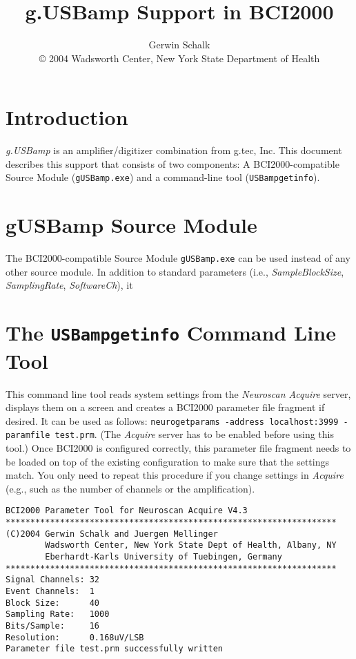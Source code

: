 \documentclass[letterpaper, oneside, 12pt]{article}
\newcommand{\ie}{i.e.,}
\newcommand{\eg}{e.g.,}
\begin{document}
%
\title{g.USBamp Support in BCI2000}
\author{Gerwin Schalk\\ \small{\copyright{} 2004 Wadsworth Center, New York State Department of Health}}
\maketitle

\tableofcontents

\newpage


\section{Introduction}

\sloppypar \emph{g.USBamp} is an amplifier/digitizer combination from g.tec, 
Inc. This document describes this support that consists of two components: A 
BCI2000-compatible Source Module (\texttt{gUSBamp.exe}) and a command-line 
tool (\texttt{USBampgetinfo}). 

\section{gUSBamp Source Module}

The BCI2000-compatible Source Module \texttt{gUSBamp.exe} can be used instead 
of any other source module. In addition to standard parameters (\ie{} 
\emph{SampleBlockSize}, \emph{SamplingRate}, \emph{SoftwareCh}), it 


\section{The \texttt{USBampgetinfo} Command Line Tool}

This command line tool reads system settings from the \emph{Neuroscan Acquire} 
server, displays them on a screen and creates a BCI2000 parameter file fragment 
if desired. It can be used as follows: \texttt{neurogetparams -address 
localhost:3999 -paramfile test.prm}. (The \emph{Acquire} server has to be 
enabled before using this tool.) Once BCI2000 is configured correctly, this 
parameter file fragment needs to be loaded on top of the existing configuration 
to make sure that the settings match. You only need to repeat this procedure if 
you change settings in \emph{Acquire} (\eg{} such as the number of channels or 
the amplification).

\begin{verbatim}
BCI2000 Parameter Tool for Neuroscan Acquire V4.3
*******************************************************************
(C)2004 Gerwin Schalk and Juergen Mellinger
        Wadsworth Center, New York State Dept of Health, Albany, NY
        Eberhardt-Karls University of Tuebingen, Germany
*******************************************************************
Signal Channels: 32
Event Channels:  1
Block Size:      40
Sampling Rate:   1000
Bits/Sample:     16
Resolution:      0.168uV/LSB
Parameter file test.prm successfully written
\end{verbatim}
\end{document}
